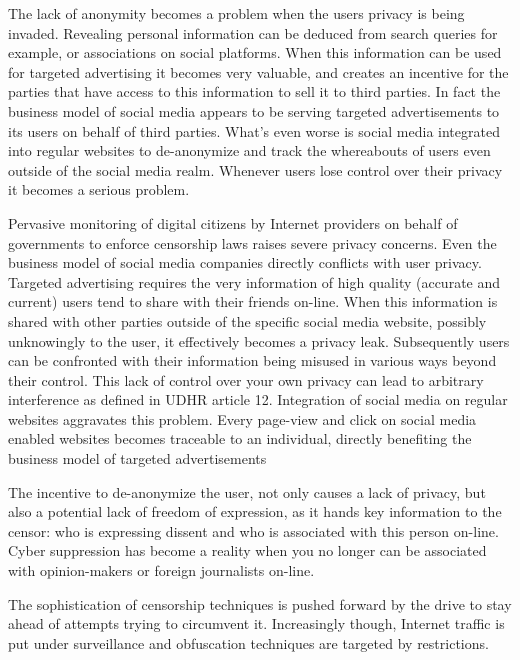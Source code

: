 The lack of anonymity becomes a problem when the users privacy is being invaded.
Revealing personal information can be deduced from search queries for example, or associations on social platforms.
When this information can be used for targeted advertising it becomes very valuable, and creates an incentive for the parties that have access to this information to sell it to third parties.
In fact the business model of social media appears to be serving targeted advertisements to its users on behalf of third parties.
What's even worse is social media integrated into regular websites to de-anonymize and track the whereabouts of users even outside of the social media realm.
Whenever users lose control over their privacy it becomes a serious problem.

Pervasive monitoring of digital citizens by Internet providers on behalf of governments to enforce censorship laws raises severe privacy concerns.
Even the business model of social media companies directly conflicts with user privacy.
Targeted advertising requires the very information of high quality (accurate and current) users tend to share with their friends on-line.
When this information is shared with other parties outside of the specific social media website, possibly unknowingly to the user, it effectively becomes a privacy leak.
Subsequently users can be confronted with their information being misused in various ways beyond their control.
This lack of control over your own privacy can lead to arbitrary interference as defined in UDHR article 12. %
Integration of social media on regular websites aggravates this problem.
Every page-view and click on social media enabled websites becomes traceable to an individual, directly benefiting the business model of targeted advertisements

The incentive to de-anonymize the user, not only causes a lack of privacy, but also a potential lack of freedom of expression, as it hands key information to the censor: who is expressing dissent and who is associated with this person on-line.
Cyber suppression has become a reality when you no longer can be associated with opinion-makers or foreign journalists on-line.


The sophistication of censorship techniques is pushed forward by the drive to stay ahead of attempts trying to circumvent it.
Increasingly though, Internet traffic is put under surveillance and obfuscation techniques are targeted by restrictions.


